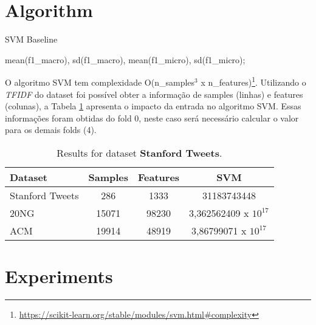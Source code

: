 \documentclass{article}
\begin{document}
	\section{Algorithm}
	
	\begin{algorithm}[ht]	
		\caption{SVM Baseline}
		\label{alg:Baseline}
		
		\Return mean(f1\_macro), sd(f1\_macro), mean(f1\_micro), sd(f1\_micro);
	\end{algorithm}

	O algoritmo SVM tem complexidade O(n\_samples$^3$ x n\_features)\footnote{\url{https://scikit-learn.org/stable/modules/svm.html\#complexity}}. Utilizando o \textit{TFIDF} do dataset foi possível obter a informação de samples (linhas) e features (colunas), a Tabela \ref{tab:dataset} apresenta o impacto da entrada no algoritmo SVM. Essas informações foram obtidas do fold 0, neste caso será necessário calcular o valor para os demais folds (4).
	
	\begin{table}[ht]
		\small
		\centering	
		\begin{tabular}{l c c c}	
			\toprule
			\textbf{Dataset} & \textbf{Samples} & \textbf{Features} & \textbf{SVM} \\
			\midrule    				
			Stanford Tweets & 286 & 1333 & 31183743448 \\ 
			20NG & 15071 & 98230 & 3,362562409 x $10^{17}$\\
			ACM & 19914 & 48919 & 3,86799071 x $10^{17}$\\
			\bottomrule 
		\end{tabular}
		\caption{Results for dataset \textbf{Stanford Tweets}.}
		\label{tab:dataset}
	\end{table}	
	
	
	
	\section{Experiments}
	
\end{document}
